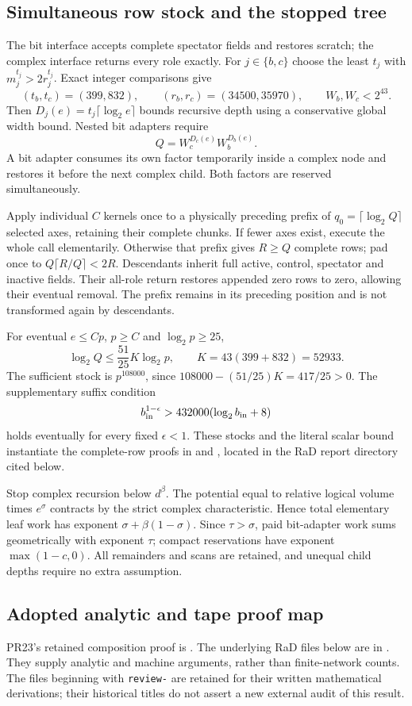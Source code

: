 \subsection{Simultaneous row stock and the stopped tree}
The bit interface accepts complete spectator fields and restores
scratch; the complex interface returns every role exactly. For
$j\in\{b,c\}$ choose the least $t_j$ with
$m_j^{t_j}>2r_j^{t_j}$. Exact integer comparisons give
\[
 (t_b,t_c)=(399,832),\qquad
 (r_b,r_c)=(34500,35970),\qquad W_b,W_c<2^{43}.
\]
Then $D_j(e)=t_j\lceil\log_2 e\rceil$ bounds recursive depth using
a conservative global width bound. Nested bit adapters require
\[
 Q=W_c^{D_c(e)}W_b^{D_b(e)}.
\]
A bit adapter consumes its own factor temporarily inside a complex
node and restores it before the next complex child. Both factors are
reserved simultaneously.

Apply individual $C$ kernels once to a physically preceding prefix of
$q_0=\lceil\log_2Q\rceil$ selected axes, retaining their complete
chunks. If fewer axes exist, execute the whole call elementarily.
Otherwise that prefix gives $R\ge Q$ complete rows; pad once to
$Q\lceil R/Q\rceil<2R$. Descendants inherit full active, control,
spectator and inactive fields. Their all-role return restores appended
zero rows to zero, allowing their eventual removal. The prefix remains
in its preceding position and is not transformed again by descendants.

For eventual $e\le Cp$, $p\ge C$ and $\log_2p\ge25$,
\[
 \log_2Q\le\frac{51}{25}K\log_2p,
 \qquad K=43(399+832)=52933.
\]
The sufficient stock is $p^{108000}$, since
$108000-(51/25)K=417/25>0$. The supplementary suffix condition
\[
 b_{\rm in}^{1-\epsilon}>432000(\log_2b_{\rm in}+8)
\]
holds eventually for every fixed $\epsilon<1$. These stocks and the
literal scalar bound instantiate the complete-row proofs in
 and
, located in
the RaD report directory cited below.

Stop complex recursion below $d^\beta$. The potential equal to relative
logical volume times $e^\sigma$ contracts by the strict complex
characteristic. Hence total elementary leaf work has exponent
$\sigma+\beta(1-\sigma)$. Since $\tau>\sigma$, paid bit-adapter work
sums geometrically with exponent $\tau$; compact reservations have
exponent $\max(1-c,0)$. All remainders and scans are retained, and
unequal child depths require no extra assumption.

\subsection{Adopted analytic and tape proof map}\label{sec:transfer}
PR23's retained composition proof is
.
The underlying RaD files below are in
.
They supply analytic and machine arguments, rather than finite-network
counts. The files beginning with \texttt{review-} are retained for their
written mathematical derivations; their historical titles do not assert
a new external audit of this result.


